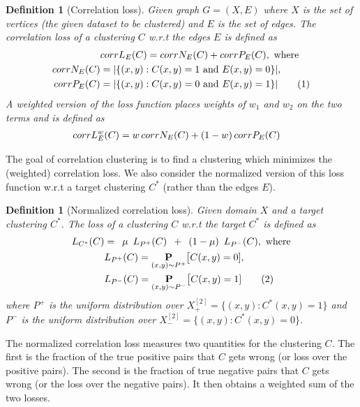 \documentclass[12pt]{article}
\newtheorem{definition}[theorem]{Definition}
\newcommand{\mb}{\mathbf}
\newcommand\numberthis{\addtocounter{equation}{1}\tag{\theequation}}
\begin{document}
\begin{definition}[Correlation loss\cite{bansal2004correlation}]
\label{defn:correlationLoss}
Given graph $G = (X, E)$ where $X$ is the set of vertices (the given dataset to be clustered) and $E$ is the set of edges. The correlation loss of a clustering $C$ w.r.t the edges $E$ is defined as \begin{align*}
  &corrL_{E}(C) = corrN_{E}(C) + corrP_{E}(C), \text{ where}\\
  corrN_{E}(C) &= |\{(x, y): C(x, y) = 1 \text{ and } E(x, y) = 0\}|,\\ 
  corrP_{E}(C) &= |\{(x, y): C(x, y) = 0 \text{ and } E(x, y) = 1\}| \numberthis\label{eqn:correlationLoss}
\end{align*}
A weighted version of the loss function places weights of $w_1$ and $w_2$ on the two terms and is defined as 
\begin{align}
  &corrL_{E}^{w}(C) = w \thinspace corrN_{E}(C) + (1-w) \thinspace corrP_{E}(C)\label{eqn:weightedCorrelationLoss}
\end{align}
\end{definition}

The goal of correlation clustering is to find a clustering which minimizes the (weighted) correlation loss. We also consider the normalized version of this loss function w.r.t a target clustering $C^*$ (rather than the edges $E$).

\begin{definition}[Normalized correlation loss]
\label{defn:normalizedCorrelationLoss}
Given domain $X$ and a target clustering $C^*$. The loss of a clustering $C$ w.r.t the target $C^*$ is defined as
\begin{align*}
  L_{C^*}(C) &= \enspace  \mu \enspace L_{P^+}(C) \enspace+\enspace (1-\mu) \enspace L_{P^-}(C), \text{ where} \\
  &L_{P^+}(C) = \underset{(x, y) \sim P^+}{\mb P} \big[ C(x, y) = 0 ],\\
  & L_{P^-}(C) = \underset{(x, y) \sim P^-}{\mb P} \big[ C(x, y) = 1] \numberthis\label{eqn:RCCV2}
\end{align*}
where $P^+$ is the uniform distribution over $X^{[2]}_+ = \{(x, y) : C^*(x, y) = 1\}$ and $P^-$ is the uniform distribution over $X^{[2]}_- = \{(x, y): C^*(x, y) = 0\}$. 
\end{definition}
The normalized correlation loss measures two quantities for the clustering $C$. The first is the fraction of the true positive pairs that $C$ gets wrong (or loss over the positive pairs). The second is the fraction of true negative pairs that $C$ gets wrong (or the loss over the negative pairs). It then obtains a weighted sum of the two losses. 
  
\end{document}
